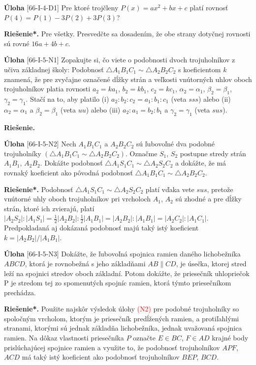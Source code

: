\documentclass{article}
\newcommand{\rie}{\textbf{Riešenie.} }
\newcommand{\rieh}{\textbf{Riešenie*.} }
\newcommand\todo[1]{\noindent\textcolor{red}{(#1)}}
\newcommand{\problem}[4]{
  \begin{tcolorbox}[breakable,notitle,boxrule=0pt,colback=light-gray,colframe=light-gray]
    \textbf{Úloha}
    [#1] #3
  \end{tcolorbox}
  \noindent#4
}
\begin{document}
\problem{66-I-4-D1}{}{
Pre ktoré trojčleny $P(x) = ax^2+ bx + c$ platí rovnosť $P(4) = P(1) - 3P(2) + 3P(3)$?
}{
\rieh Pre všetky. Presvedčte sa dosadením, že obe strany dotyčnej rovnosti sú rovné $16a + 4b + c.$
}



\problem{66-I-5-N1}{}{
Zopakujte si, čo viete o podobnosti dvoch trojuholníkov z učiva základnej školy: Podobnosť $\triangle A_1B_1C_1 \sim  \triangle A_2B_2C_2$ s koeficientom $k$ znamená, že pre zvyčajne označené dĺžky strán a veľkosti vnútorných uhlov oboch trojuholníkov platia rovnosti $a_2 = ka_1$, $b_2 = kb_1$, $c_2 = kc_1$, $\alpha_2 = \alpha_1$, $\beta_2 = \beta_1$, $\gamma_2 = \gamma_1$. Stačí na to, aby platilo (i) $a_2 : b_2 : c_2 = a_1 : b_1 : c_1$ (veta $sss$) alebo (ii) $\alpha_2 = \alpha_1$ a $\beta_2 = \beta_1$ (veta $uu$) alebo (iii) $a_2 : a_1 = b_2 : b_1$ a $\gamma_2 = \gamma_1$ (veta $sus$).
}{
\rie
}

\problem{66-I-5-N2}{}{
Nech $A_1 B_1 C_1$ a $A_2 B_2 C_2$ sú ľubovoľné dva podobné trojuholníky $(\triangle A_1 B_1 C_1 \sim \triangle A_2 B_2 C_2)$.  Označme $S_1$, $S_2$ postupne stredy strán $A_1 B_1$, $A_2 B_2$. Dokážte podobnosť $\triangle A_1 S_1 C_1 \sim \triangle A_2 S_2 C_2$ a dokážte, že má rovnaký koeficient ako pôvodná podobnosť $\triangle A_1 B_1 C_1 \sim \triangle A_2 B_2 C_2$.
}{
\rieh Podobnosť $\triangle A_1 S_1 C_1 \sim \triangle A_2 S_2 C_2$ platí vďaka vete $sus$, pretože vnútorné uhly oboch trojuholníkov pri vrcholoch $A_1$, $A_2$ sú zhodné a pre dĺžky strán, ktoré ich zvierajú, platí $|A_2 S_2 | : |A_1 S_1 | = \frac{1}{2}|A_2 B_2 | : \frac{1}{2}|A_1 B_1 |= |A_2 B_2 | : |A_1 B_1| = |A_2 C_2 | : |A_1 C_1 |$. Predpokladaná aj dokázaná podobnosť majú taký istý koeficient $k = |A_2 B_2|/|A_1 B_1|$.
}

\problem{66-I-5-N3}{}{
Dokážte, že ľubovoľná spojnica ramien daného lichobežníka $ABCD$, ktorá je rovnobežná s jeho základňami $AB \parallel CD$, je úsečka, ktorej stred leží na spojnici stredov oboch základní. Potom dokážte, že priesečník uhlopriečok P je stredom tej zo spomenutých spojníc ramien, ktorá týmto priesečníkom prechádza.
}{
\rieh Použite najskôr výsledok úlohy \todo{N2} pre podobné trojuholníky so spoločným vrcholom, ktorým je priesečník predĺžených ramien, a protiľahlými stranami, ktorými sú jednak základňa lichobežníka, jednak uvažovaná spojnica ramien. Na dôkaz vlastnosti priesečníka $P$ označte $E \in BC$, $F \in AD$ krajné body prislúchajúcej spojnice ramien a využite to, že podobnosť trojuholníkov $APF$, $ACD$ má taký istý koeficient ako podobnosť trojuholníkov $BEP$, $BCD$.
}
\end{document}

